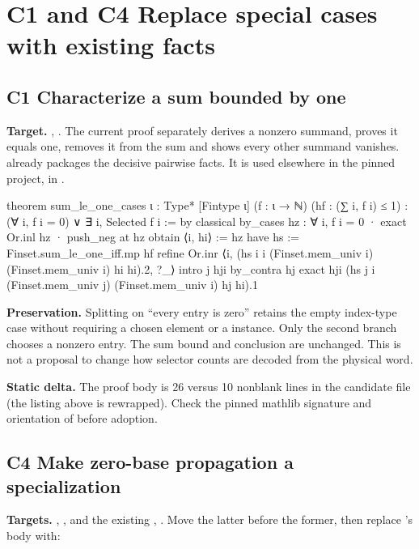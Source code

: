 \section{C1 and C4 Replace special cases with existing facts}
\label{sec:simple}

\subsection{C1 Characterize a sum bounded by one}

\textbf{Target.} ,
. The current proof separately derives a nonzero
summand, proves it equals one, removes it from the sum and shows every other
summand vanishes.  already packages the decisive
pairwise facts. It is used elsewhere in the pinned project, in
.

\begin{Lean}
theorem sum_le_one_cases {ι : Type*} [Fintype ι]
    (f : ι → ℕ) (hf : (∑ i, f i) ≤ 1) :
    (∀ i, f i = 0) ∨ ∃ i, Selected f i := by
  classical
  by_cases hz : ∀ i, f i = 0
  · exact Or.inl hz
  · push_neg at hz
    obtain ⟨i, hi⟩ := hz
    have hs := Finset.sum_le_one_iff.mp hf
    refine Or.inr ⟨i,
      (hs i i (Finset.mem_univ i) (Finset.mem_univ i) hi hi).2,
      ?_⟩
    intro j hji
    by_contra hj
    exact hji
      (hs j i (Finset.mem_univ j) (Finset.mem_univ i) hj hi).1
\end{Lean}

\textbf{Preservation.} Splitting on ``every entry is zero'' retains the empty
index-type case without requiring a chosen element or a 
instance. Only the second branch chooses a nonzero entry. The sum bound and
 conclusion are unchanged. This is not a proposal to change
how selector counts are decoded from the physical word.

\textbf{Static delta.} The proof body is 26 versus 10 nonblank lines in the
candidate file (the listing above is rewrapped). Check the pinned mathlib
signature and orientation of  before adoption.

\subsection{C4 Make zero-base propagation a specialization}

\textbf{Targets.} ,
, and the existing ,
. Move the latter before the former, then replace
's body with:

